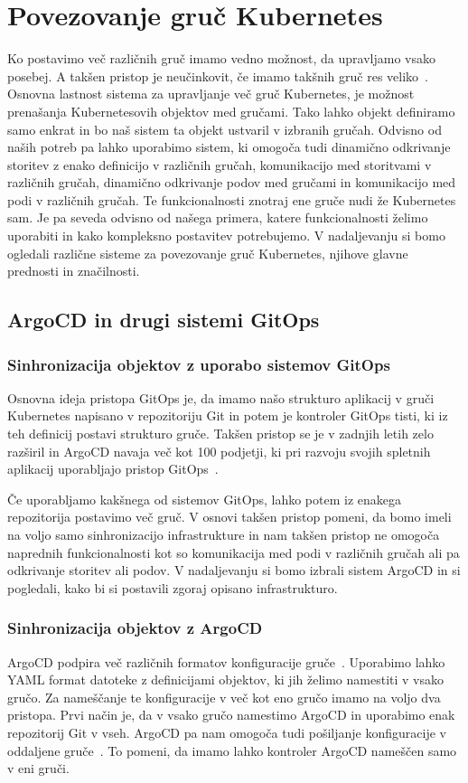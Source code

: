 \documentclass[a4paper, 12pt]{book}
\begin{document}
\chapter{Povezovanje gruč Kubernetes}
Ko postavimo več različnih gruč imamo vedno možnost, da upravljamo vsako posebej.
A takšen pristop je neučinkovit, če imamo takšnih gruč res veliko~\cite{difference-multi-cluster}.
Osnovna lastnost sistema za upravljanje več gruč Kubernetes, je možnost prenašanja Kubernetesovih objektov med gručami.
Tako lahko objekt definiramo samo enkrat in bo naš sistem ta objekt ustvaril v izbranih gručah.
Odvisno od naših potreb pa lahko uporabimo sistem, ki omogoča tudi dinamično odkrivanje storitev z enako definicijo v različnih gručah, komunikacijo med storitvami v različnih gručah, dinamično odkrivanje podov med gručami in komunikacijo med podi v različnih gručah.
Te funkcionalnosti znotraj ene gruče nudi že Kubernetes sam.
Je pa seveda odvisno od našega primera, katere funkcionalnosti želimo uporabiti in kako kompleksno postavitev potrebujemo.
V nadaljevanju si bomo ogledali različne sisteme za povezovanje gruč Kubernetes, njihove glavne prednosti in značilnosti.
\section{ArgoCD in drugi sistemi GitOps}
\subsection{Sinhronizacija objektov z uporabo sistemov GitOps}
Osnovna ideja pristopa GitOps je, da imamo našo strukturo aplikacij v gruči Kubernetes napisano v repozitoriju Git in potem je kontroler GitOps tisti, ki iz teh definicij postavi strukturo gruče.
Takšen pristop se je v zadnjih letih zelo razširil in ArgoCD navaja več kot 100 podjetji, ki pri razvoju svojih spletnih aplikacij uporabljajo pristop GitOps~\cite{argocd-user-list}.

Če uporabljamo kakšnega od sistemov GitOps, lahko potem iz enakega repozitorija postavimo več gruč.
V osnovi takšen pristop pomeni, da bomo imeli na voljo samo sinhronizacijo infrastrukture in nam takšen pristop ne omogoča naprednih funkcionalnosti kot so komunikacija med podi v različnih gručah ali pa odkrivanje storitev ali podov.
V nadaljevanju si bomo izbrali sistem ArgoCD in si pogledali, kako bi si postavili zgoraj opisano infrastrukturo.
\subsection{Sinhronizacija objektov z ArgoCD}
ArgoCD podpira več različnih formatov konfiguracije gruče~\cite{argocd-docs}.
Uporabimo lahko YAML format datoteke z definicijami objektov, ki jih želimo namestiti v vsako gručo.
Za nameščanje te konfiguracije v več kot eno gručo imamo na voljo dva pristopa.
Prvi način je, da v vsako gručo namestimo ArgoCD in uporabimo enak repozitorij Git v vseh.
ArgoCD pa nam omogoča tudi pošiljanje konfiguracije v oddaljene gruče~\cite{declarative-setup}.
To pomeni, da imamo lahko kontroler ArgoCD nameščen samo v eni gruči.
\end{document}
